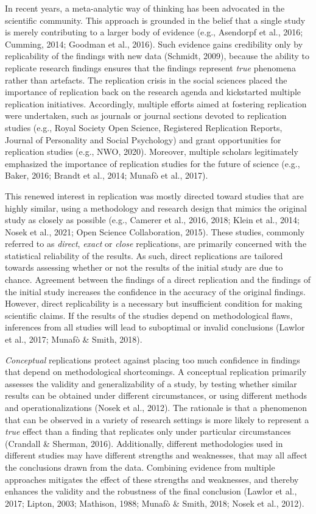 \documentclass[
]{interact}
\begin{document}
In recent years, a meta-analytic way of thinking has been advocated in
the scientific community. This approach is grounded in the belief that a
single study is merely contributing to a larger body of evidence (e.g.,
Asendorpf et al., 2016; Cumming, 2014; Goodman et al., 2016). Such
evidence gains credibility only by replicability of the findings with
new data (Schmidt, 2009), because the ability to replicate research
findings ensures that the findings represent \emph{true} phenomena
rather than artefacts. The replication crisis in the social sciences
placed the importance of replication back on the research agenda and
kickstarted multiple replication initiatives. Accordingly, multiple
efforts aimed at fostering replication were undertaken, such as journals
or journal sections devoted to replication studies (e.g., Royal Society
Open Science, Registered Replication Reports, Journal of Personality and
Social Psychology) and grant opportunities for replication studies
(e.g., NWO, 2020). Moreover, multiple scholars legitimately emphasized
the importance of replication studies for the future of science (e.g.,
Baker, 2016; Brandt et al., 2014; Munafò et al., 2017).

This renewed interest in replication was mostly directed toward studies
that are highly similar, using a methodology and research design that
mimics the original study as closely as possible (e.g., Camerer et al.,
2016, 2018; Klein et al., 2014; Nosek et al., 2021; Open Science
Collaboration, 2015). These studies, commonly referred to as
\emph{direct}, \emph{exact} or \emph{close} replications, are primarily
concerned with the statistical reliability of the results. As such,
direct replications are tailored towards assessing whether or not the
results of the initial study are due to chance. Agreement between the
findings of a direct replication and the findings of the initial study
increases the confidence in the accuracy of the original findings.
However, direct replicability is a necessary but insufficient condition
for making scientific claims. If the results of the studies depend on
methodological flaws, inferences from all studies will lead to
suboptimal or invalid conclusions (Lawlor et al., 2017; Munafò \& Smith,
2018).

\emph{Conceptual} replications protect against placing too much
confidence in findings that depend on methodological shortcomings. A
conceptual replication primarily assesses the validity and
generalizability of a study, by testing whether similar results can be
obtained under different circumstances, or using different methods and
operationalizations (Nosek et al., 2012). The rationale is that a
phenomenon that can be observed in a variety of research settings is
more likely to represent a \emph{true} effect than a finding that
replicates only under particular circumstances (Crandall \& Sherman,
2016). Additionally, different methodologies used in different studies
may have different strengths and weaknesses, that may all affect the
conclusions drawn from the data. Combining evidence from multiple
approaches mitigates the effect of these strengths and weaknesses, and
thereby enhances the validity and the robustness of the final conclusion
(Lawlor et al., 2017; Lipton, 2003; Mathison, 1988; Munafò \& Smith,
2018; Nosek et al., 2012).
\end{document}
